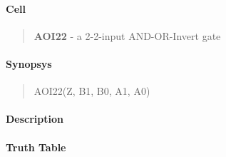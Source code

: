 \label{AOI22}
\paragraph{Cell}
\begin{quote}
    \textbf{AOI22} - a 2-2-input AND-OR-Invert gate
\end{quote}

\paragraph{Synopsys}
\begin{quote}
    AOI22(Z, B1, B0, A1, A0)
\end{quote}

\paragraph{Description}

%

\paragraph{Truth Table}


